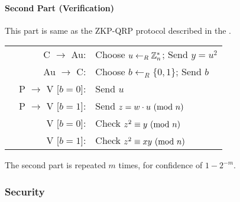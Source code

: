 \paragraph{Second Part (Verification)}
This part is same as the ZKP-QRP protocol described in the \cite{GMR}.

\bigskip

\begin{center}
\begin{tabular}{lrl} %
	& C $\rightarrow$ Au: & Choose $u \leftarrow_R \Bbb{Z}_{n}^{*}$; Send $y = u^2$\\
	& Au $\rightarrow$ C: & Choose $b \leftarrow_R \{0, 1\} $; Send $b$\\
	& P $\rightarrow$ V [$b = 0$]: & Send $u$\\
	& P $\rightarrow$ V [$b = 1$]: & Send $z = w \cdot u \ (\mathrm{mod}\ n)$\\
	& V [$b = 0$]: & Check $z^2 \equiv y \ (\mathrm{mod}\ n)$\\
	& V [$b = 1$]: & Check $z^2 \equiv xy \ (\mathrm{mod}\ n)$\\
\end{tabular}
\end{center}

\bigskip

The second part is repeated $m$ times, for confidence of $1 - 2^{-m}$.

\subsubsection{Security}



